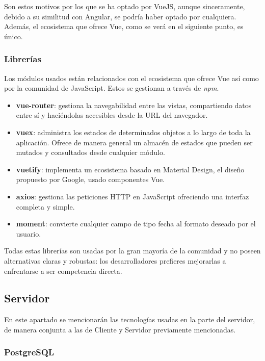 Son estos motivos por los que se ha optado por VueJS, aunque sinceramente, debido a su similitud con Angular, se podría haber optado por cualquiera. Además, el ecosistema que ofrece Vue, como se verá en el siguiente punto, es único.

\subsubsection{Librerías}

Los módulos usados están relacionados con el ecosistema que ofrece Vue así como por la comunidad de JavaScript. Estos se gestionan a través de \textit{npm}.

\begin{itemize}
    \item \textbf{vue-router}: gestiona la navegabilidad entre las vistas, compartiendo datos entre sí y haciéndolas accesibles desde la URL del navegador.
    \item \textbf{vuex}: administra los estados de determinados objetos a lo largo de toda la aplicación. Ofrece de manera general un almacén de estados que pueden ser mutados y consultados desde cualquier módulo.
    \item \textbf{vuetify}: implementa un ecosistema basado en Material Design, el diseño propuesto por Google, usado componentes Vue.
    \item \textbf{axios}: gestiona las peticiones HTTP en JavaScript ofreciendo una interfaz completa y simple.
    \item \textbf{moment}: convierte cualquier campo de tipo fecha al formato deseado por el usuario.
\end{itemize}

Todas estas librerías son usadas por la gran mayoría de la comunidad y no poseen alternativas claras y robustas: los desarrolladores prefieres mejorarlas a enfrentarse a ser competencia directa.

\subsection{Servidor}

En este apartado se mencionarán las tecnologías usadas en la parte del servidor, de manera conjunta a las de Cliente y Servidor previamente mencionadas.

\subsubsection{PostgreSQL}

